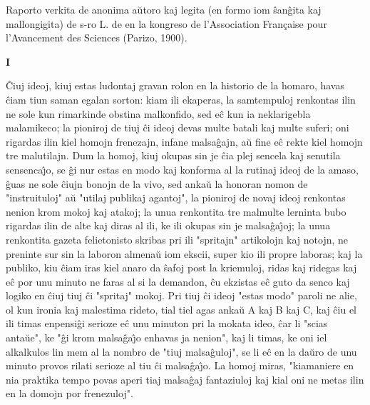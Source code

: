 \begin{center}
\footnotesize Raporto verkita de anonima a\u utoro kaj legita (en formo iom
\^san\^gita kaj mallongigita) de s-ro L. de  en la kongreso
de l'Association Française pour l'Avancement des Sciences (Parizo,
1900).
\end{center}
\begin{center}
\textbf{I}
\end{center}

   \^Ciuj ideoj, kiuj estas ludontaj gravan rolon en la historio de la
homaro, havas \^ciam tiun saman egalan sorton: kiam ili ekaperas, la
samtempuloj renkontas ilin ne sole kun rimarkinde obstina
malkonfido, sed e\^c kun ia neklarigebla malamikeco; la pioniroj de
tiuj \^ci ideoj devas multe batali kaj multe suferi; oni rigardas
ilin kiel homojn frenezajn, infane malsa\^gajn, a\u u fine e\^c
rekte kiel homojn tre malutilajn. Dum la homoj, kiuj okupas sin je
\^cia plej sencela kaj senutila sensenca\^{\j}o, se \^gi nur estas
en modo kaj konforma al la rutinaj ideoj de la amaso, \^guas ne sole
\^ciujn bonojn de la vivo, sed anka\u u la honoran nomon de
"instruituloj" a\u u "utilaj publikaj agantoj", la pioniroj de
novaj ideoj renkontas nenion krom mokoj kaj atakoj; la unua
renkontita tre malmulte lerninta bubo rigardas ilin de alte kaj
diras al ili, ke ili okupas sin je malsa\^ga\^{\j}oj; la unua
renkontita gazeta felietonisto skribas pri ili "spritajn"
artikolojn kaj notojn, ne preninte sur sin la laboron almena\u u iom
ekscii, super kio ili propre laboras; kaj la publiko, kiu \^ciam
iras kiel anaro da \^safoj post la kriemuloj, ridas kaj ridegas kaj
e\^c por unu minuto ne faras al si la demandon, \^cu ekzistas e\^c
guto da senco kaj logiko en \^ciuj tiuj \^ci "spritaj" mokoj. Pri
tiuj \^ci ideoj "estas modo" paroli ne alie, ol kun ironia kaj
malestima rideto, tial tiel agas anka\u u A kaj B kaj C, kaj \^ciu
el ili timas enpensi\^gi serioze e\^c unu minuton pri la mokata
ideo, \^car li "scias anta\u ue", ke "\^gi krom malsa\^ga\^{\j}o
enhavas ja nenion", kaj li timas, ke oni iel alkalkulos lin mem al
la nombro de "tiuj malsa\^guloj", se li e\^c en la da\u uro de unu
minuto provos rilati serioze al tiu \^ci malsa\^ga\^{\j}o. La homoj
miras, "kiamaniere en nia praktika tempo povas aperi tiaj
malsa\^gaj fantaziuloj kaj kial oni ne metas ilin en la domojn por
frenezuloj".

